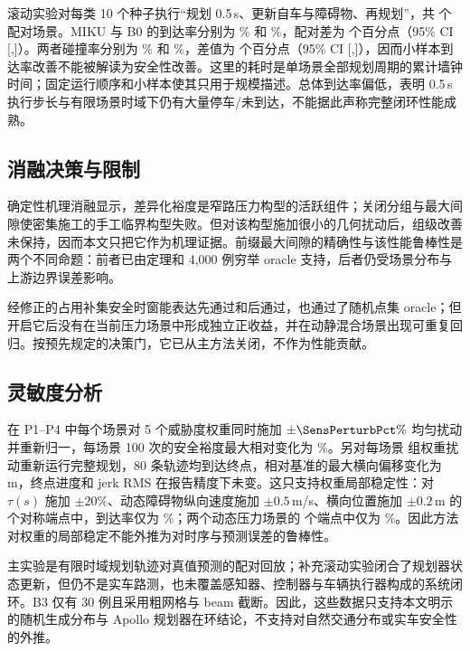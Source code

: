 滚动实验对每类 10 个种子执行“规划 0.5\,s、更新自车与障碍物、再规划”，共 \ClosedCaseCount 个配对场景。MIKU 与 B0 的到达率分别为 \ClosedMikuSuccessPct\% 和 \ClosedBZeroSuccessPct\%，配对差为 \ClosedMikuVsBZeroSuccessDiff 个百分点（95\% CI [\ClosedMikuVsBZeroSuccessCiLow,\ClosedMikuVsBZeroSuccessCiHigh]）。两者碰撞率分别为 \ClosedMikuCollisionPct\% 和 \ClosedBZeroCollisionPct\%，差值为 \ClosedMikuVsBZeroCollisionDiff 个百分点（95\% CI [\ClosedMikuVsBZeroCollisionCiLow,\ClosedMikuVsBZeroCollisionCiHigh]），因而小样本到达率改善不能被解读为安全性改善。这里的耗时是单场景全部规划周期的累计墙钟时间；固定运行顺序和小样本使其只用于规模描述。总体到达率偏低，表明 0.5\,s 执行步长与有限场景时域下仍有大量停车/未到达，不能据此声称完整闭环性能成熟。

\subsection{消融决策与限制}

确定性机理消融显示，差异化裕度是窄路压力构型的活跃组件；关闭分组与最大间隙使密集施工的手工临界构型失败。但对该构型施加很小的几何扰动后，组级改善未保持，因而本文只把它作为机理证据。前缀最大间隙的精确性与该性能鲁棒性是两个不同命题：前者已由定理和 4,000 例穷举 oracle 支持，后者仍受场景分布与上游边界误差影响。

经修正的占用补集安全时窗能表达先通过和后通过，也通过了随机点集 oracle；但开启它后没有在当前压力场景中形成独立正收益，并在动静混合场景出现可重复回归。按预先规定的决策门，它已从主方法关闭，不作为性能贡献。

\subsection{灵敏度分析}

在 P1--P4 中每个场景对 5 个威胁度权重同时施加 $\pm\SensPerturbPct\%$ 均匀扰动并重新归一，每场景 100 次的安全裕度最大相对变化为 \SensWorstRelDev\%。另对每场景 \SensTrajectoryTrialCount 组权重扰动重新运行完整规划，80 条轨迹均到达终点，相对基准的最大横向偏移变化为 \SensOneTrajectoryMaxLateralDev\,m，终点进度和 jerk RMS 在报告精度下未变。这只支持权重局部稳定性：对 $\tau(s)$ 施加 $\pm20\%$、动态障碍物纵向速度施加 $\pm0.5$\,m/s、横向位置施加 $\pm0.2$\,m 的 \SensSingleFactorCount 个对称端点中，到达率仅为 \SensSingleFactorSuccessPct\%；两个动态压力场景的 \SensDynamicSingleFactorCount 个端点中仅为 \SensDynamicSingleFactorSuccessPct\%。因此方法对权重的局部稳定不能外推为对时序与预测误差的鲁棒性。

主实验是有限时域规划轨迹对真值预测的配对回放；补充滚动实验闭合了规划器状态更新，但仍不是实车路测，也未覆盖感知器、控制器与车辆执行器构成的系统闭环。B3 仅有 30 例且采用粗网格与 beam 截断。因此，这些数据只支持本文明示的随机生成分布与 Apollo 规划器在环结论，不支持对自然交通分布或实车安全性的外推。
